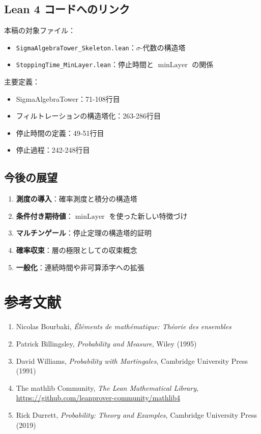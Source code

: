 \documentclass[12pt,a4paper]{article}
\theoremstyle{definition}
\DeclareMathOperator{\minLayer}{minLayer}
\begin{document}
\subsection{Lean 4 コードへのリンク}

本稿の対象ファイル：

\begin{itemize}
\item \texttt{SigmaAlgebraTower\_Skeleton.lean}：$\sigma$-代数の構造塔
\item \texttt{StoppingTime\_MinLayer.lean}：停止時間と $\minLayer$ の関係
\end{itemize}

主要定義：

\begin{itemize}
\item SigmaAlgebraTower：71-108行目
\item フィルトレーションの構造塔化：263-286行目
\item 停止時間の定義：49-51行目
\item 停止過程：242-248行目
\end{itemize}

\subsection{今後の展望}

\begin{enumerate}
\item \textbf{測度の導入}：確率測度と積分の構造塔
\item \textbf{条件付き期待値}：$\minLayer$ を使った新しい特徴づけ
\item \textbf{マルチンゲール}：停止定理の構造塔的証明
\item \textbf{確率収束}：層の極限としての収束概念
\item \textbf{一般化}：連続時間や非可算添字への拡張
\end{enumerate}

\section*{参考文献}

\begin{enumerate}
\item Nicolas Bourbaki, \textit{Éléments de mathématique: Théorie des ensembles}
\item Patrick Billingsley, \textit{Probability and Measure}, Wiley (1995)
\item David Williams, \textit{Probability with Martingales}, Cambridge University Press (1991)
\item The mathlib Community, \textit{The Lean Mathematical Library}, \url{https://github.com/leanprover-community/mathlib4}
\item Rick Durrett, \textit{Probability: Theory and Examples}, Cambridge University Press (2019)
\end{enumerate}
\end{document}

